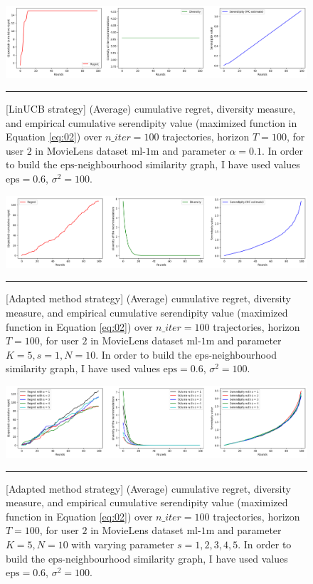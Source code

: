 \documentclass{article}
\begin{document}
\begin{figure}[H]
  \centering
  \rule[-.5cm]{0cm}{4cm}
  \includegraphics[scale=0.4]{../Results/ml-1m/linUCB-39sec.png}
  \rule[-.5cm]{4cm}{0cm}
  \caption{[LinUCB strategy] (Average) cumulative regret, diversity measure, and empirical cumulative serendipity value (maximized function in Equation \ref{eq:02}) over $n\_iter=100$ trajectories, horizon $T=100$, for user $2$ in MovieLens dataset $\text{ml-1m}$ and parameter $\alpha=0.1$. In order to build the $\text{eps}$-neighbourhood similarity graph, I have used values $\text{eps}=0.6$, $\sigma^{2}=100$.}
\label{figlinUCB}
\end{figure}

\begin{figure}[H]
  \centering
  \rule[-.5cm]{0cm}{4cm}
  \includegraphics[scale=0.4]{../Results/ml-1m/lagree-1min31sec.png}
  \rule[-.5cm]{4cm}{0cm}
  \caption{[Adapted method strategy] (Average) cumulative regret, diversity measure, and empirical cumulative serendipity value (maximized function in Equation \ref{eq:02}) over $n\_iter=100$ trajectories, horizon $T=100$, for user $2$ in MovieLens dataset $\text{ml-1m}$ and parameter $K=5, s=1, N=10$. In order to build the $\text{eps}$-neighbourhood similarity graph, I have used values $\text{eps}=0.6$, $\sigma^{2}=100$.}
\label{figlagree}
\end{figure}

\begin{figure}[H]
  \centering
  \rule[-.5cm]{0cm}{4cm}
  \includegraphics[scale=0.4]{../Results/ml-1m/lagree.png}
  \rule[-.5cm]{4cm}{0cm}
  \caption{[Adapted method strategy] (Average) cumulative regret, diversity measure, and empirical cumulative serendipity value (maximized function in Equation \ref{eq:02}) over $n\_iter=100$ trajectories, horizon $T=100$, for user $2$ in MovieLens dataset $\text{ml-1m}$ and parameter $K=5, N=10$ with varying parameter $s=1, 2, 3, 4, 5$. In order to build the $\text{eps}$-neighbourhood similarity graph, I have used values $\text{eps}=0.6$, $\sigma^{2}=100$.}
\label{figlagreecomp}
\end{figure}
\end{document}
